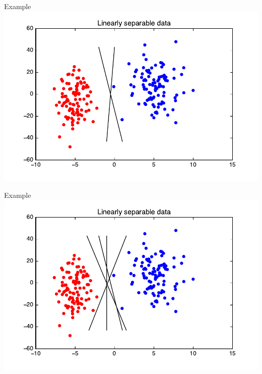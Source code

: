\documentclass{beamer}
\begin{document}

\begin{frame}{Example}
    \includegraphics[scale=0.7]{figures/SVM_data_lines.pdf}
\end{frame}


\begin{frame}{Example}
    \includegraphics[scale=0.7]{figures/SVM_data_morelines.pdf}
\end{frame}

\end{document}
